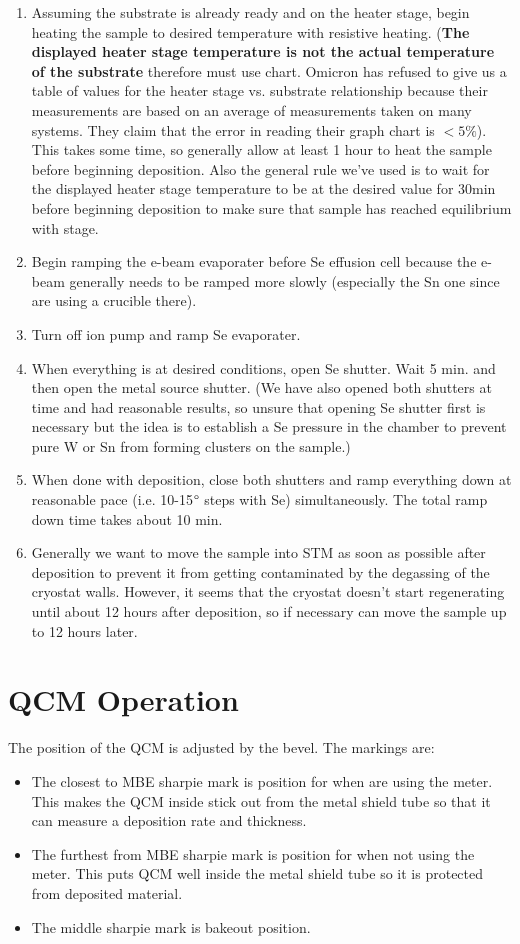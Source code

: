 \begin{enumerate}
	\item Assuming the substrate is already ready and on the heater stage, begin heating the sample to desired temperature with resistive heating. (\textbf{The displayed heater stage temperature is not the actual temperature of the substrate} therefore must use chart. Omicron has refused to give us a table of values for the heater stage vs. substrate relationship because their measurements are based on an average of measurements taken on many systems. They claim that the error in reading their graph chart is $<5\%$). This takes some time, so generally allow at least 1 hour to heat the sample before beginning deposition. Also the general rule we've used is to wait for the displayed heater stage temperature to be at the desired value for 30min before beginning deposition to make sure that sample has reached equilibrium with stage.
	\item Begin ramping the e-beam evaporater before Se effusion cell because the e-beam generally needs to be ramped more slowly (especially the Sn one since are using a crucible there).
	\item Turn off ion pump and ramp Se evaporater. 
	\item When everything is at desired conditions, open Se shutter. Wait 5 min. and then open the metal source shutter. (We have also opened both shutters at time and had reasonable results, so unsure that opening  Se shutter first is necessary but the idea is to establish a Se pressure in the chamber to prevent pure W or Sn from forming clusters on the sample.)
	\item When done with deposition, close both shutters and ramp everything down at reasonable pace (i.e. 10-15$\degree$ steps with Se) simultaneously. The total ramp down time takes about 10 min.
	\item Generally we want to  move the sample into STM as soon as possible after deposition to prevent it from getting contaminated by the degassing of the cryostat walls. However, it seems that the cryostat doesn't start regenerating until about 12 hours after deposition, so if necessary can move the sample up to 12 hours later.
\end{enumerate}

\section{QCM Operation}
The position of the QCM is adjusted by the bevel. The markings are:
\begin{itemize}
\item The closest to MBE sharpie mark is position for when are using the meter. This makes the QCM inside stick out from the metal shield tube so that it can measure a deposition rate and thickness.
\item The furthest from MBE sharpie mark is position for when not using the meter. This puts QCM well inside the metal shield tube so it is protected from deposited material.
\item The middle sharpie mark is bakeout position.
\end{itemize}

